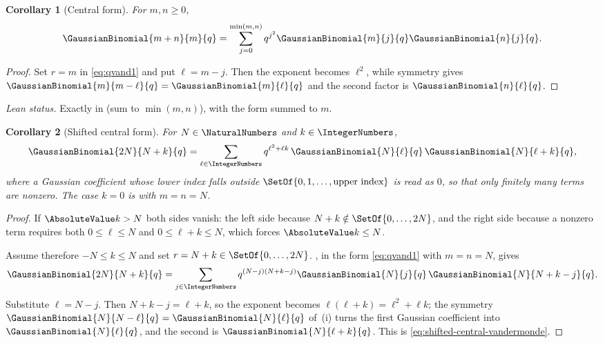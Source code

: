 \documentclass[11pt,a4paper,oneside,openany]{book}
\newtheorem{corollary}[corollary]{Corollary}
\theoremstyle{definition}
\theoremstyle{remark}
\begin{document}
\begin{corollary}[Central form]\label{cor:central-vandermonde}
For $m,n\ge0$,
\[
 \GaussianBinomial{m+n}{m}{q}
 =\sum_{j=0}^{\min(m,n)}
 q^{j^2}\GaussianBinomial{m}{j}{q}\GaussianBinomial{n}{j}{q}.
\]
\end{corollary}

\begin{proof}
Set $r=m$ in \eqref{eq:qvand1} and put $\ell=m-j$.  Then the exponent becomes $\ell^2$, while symmetry gives $\GaussianBinomial{m}{m-\ell}{q}=\GaussianBinomial{m}{\ell}{q}$ and the second factor is $\GaussianBinomial{n}{\ell}{q}$.
\end{proof}

\emph{Lean status.}  Exactly  in
 (sum to $\min(m,n)$), with
 the form summed to $m$.



\begin{corollary}[Shifted central form]\label{cor:shifted-central-vandermonde}
For $N\in\NaturalNumbers$ and $k\in\IntegerNumbers$,
\begin{equation}
 \GaussianBinomial{2N}{N+k}{q}
 =\sum_{\ell\in\IntegerNumbers}q^{\ell^2+\ell k}\,
 \GaussianBinomial{N}{\ell}{q}\,\GaussianBinomial{N}{\ell+k}{q},
 \label{eq:shifted-central-vandermonde}
\end{equation}
where a Gaussian coefficient whose lower index falls outside $\SetOf{0,1,\dots,\text{upper index}}$ is read as $0$, so that only finitely many terms are nonzero.  The case $k=0$ is  with $m=n=N$.
\end{corollary}

\begin{proof}
If $\AbsoluteValue k>N$ both sides vanish: the left side because $N+k\notin\SetOf{0,\dots,2N}$, and the right side because a nonzero term requires both $0\le\ell\le N$ and $0\le\ell+k\le N$, which forces $\AbsoluteValue k\le N$.

Assume therefore $-N\le k\le N$ and set $r=N+k\in\SetOf{0,\dots,2N}$.  , in the form \eqref{eq:qvand1} with $m=n=N$, gives
\[
 \GaussianBinomial{2N}{N+k}{q}
 =\sum_{j\in\IntegerNumbers}q^{(N-j)(N+k-j)}
 \GaussianBinomial{N}{j}{q}\,\GaussianBinomial{N}{N+k-j}{q}.
\]
Substitute $\ell=N-j$.  Then $N+k-j=\ell+k$, so the exponent becomes $\ell(\ell+k)=\ell^2+\ell k$; the symmetry $\GaussianBinomial{N}{N-\ell}{q}=\GaussianBinomial{N}{\ell}{q}$ of \,(i) turns the first Gaussian coefficient into $\GaussianBinomial{N}{\ell}{q}$, and the second is $\GaussianBinomial{N}{\ell+k}{q}$.  This is \eqref{eq:shifted-central-vandermonde}.
\end{proof}
\end{document}
